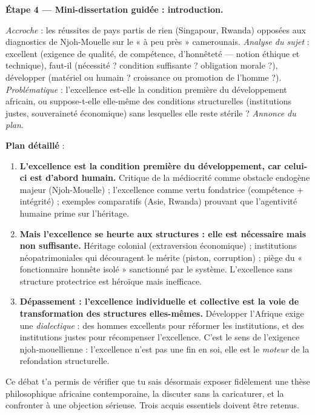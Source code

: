 \documentclass[11pt]{article}
\newcommand{\cle}[1]{{\popxbold\color{popdark}#1}}
\newcounter{popsec}
\newcounter{popsub}
\newcommand{\courssub}[1]{%
  \stepcounter{popsub}%
  \par\vspace{9pt}\noindent{\popxbold\fontsize{11.5}{13}\selectfont\color{popink}{\color{poporange}\thepopsec.\thepopsub}\hspace{6pt}#1}\par\nopagebreak\vspace{4pt}
}
\begin{document}
\begin{exoresolu}
\textbf{Étape 4 — Mini-dissertation guidée : introduction.}

\emph{Accroche} : les réussites de pays partis de rien (Singapour, Rwanda) opposées aux diagnostics de Njoh-Mouelle sur le « à peu près » camerounais. \emph{Analyse du sujet} : \guillemotleft excellent \guillemotright (exigence de qualité, de compétence, d'honnêteté — notion éthique et technique), \guillemotleft faut-il \guillemotright (nécessité ? condition suffisante ? obligation morale ?), \guillemotleft développer \guillemotright (matériel ou humain ? croissance ou promotion de l'homme ?). \emph{Problématique} : l'excellence est-elle la condition première du développement africain, ou suppose-t-elle elle-même des conditions structurelles (institutions justes, souveraineté économique) sans lesquelles elle reste stérile ? \emph{Annonce du plan}.

\textbf{Plan détaillé} :
\begin{enumerate}
\item \textbf{L'excellence est la condition première du développement, car celui-ci est d'abord humain.} Critique de la médiocrité comme obstacle endogène majeur (Njoh-Mouelle) ; l'excellence comme vertu fondatrice (compétence + intégrité) ; exemples comparatifs (Asie, Rwanda) prouvant que l'agentivité humaine prime sur l'héritage.
\item \textbf{Mais l'excellence se heurte aux structures : elle est nécessaire mais non suffisante.} Héritage colonial (extraversion économique) ; institutions néopatrimoniales qui découragent le mérite (piston, corruption) ; piège du « fonctionnaire honnête isolé » sanctionné par le système. L'excellence sans structure protectrice est héroïque mais inefficace.
\item \textbf{Dépassement : l'excellence individuelle et collective est la voie de transformation des structures elles-mêmes.} Développer l'Afrique exige une \emph{dialectique} : des hommes excellents pour réformer les institutions, et des institutions justes pour récompenser l'excellence. C'est le sens de l'exigence njoh-mouellienne : l'excellence n'est pas une fin en soi, elle est le \emph{moteur} de la refondation structurelle.
\end{enumerate}
\end{exoresolu}

\courssub{Bilan de l'activité}

Ce débat t'a permis de vérifier que tu sais désormais \cle{exposer} fidèlement une thèse philosophique africaine contemporaine, la \cle{discuter} sans la caricaturer, et la \cle{confronter} à une objection sérieuse. Trois acquis essentiels doivent être retenus.
\end{document}
